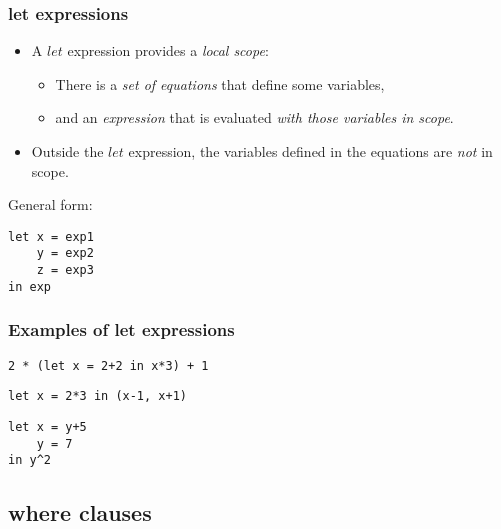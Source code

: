 \documentclass{beamer}
\begin{document}
\begin{frame}[fragile]
\frametitle{let expressions}

\begin{itemize}
\item A $let$ expression provides a \emph{local scope}:
  \begin{itemize}
  \item There is a \emph{set of equations} that define some
    variables,
  \item and an \emph{expression} that is evaluated \emph{with those
      variables in scope}.
  \end{itemize}
\item Outside the $let$ expression, the variables defined in the
  equations are \emph{not} in scope.
\end{itemize}

General form:

\begin{verbatim}
let x = exp1
    y = exp2
    z = exp3
in exp
\end{verbatim}

\end{frame}

\begin{frame}[fragile]
\frametitle{Examples of let expressions}

\begin{verbatim}
2 * (let x = 2+2 in x*3) + 1
\end{verbatim}

\begin{verbatim}
let x = 2*3 in (x-1, x+1)
\end{verbatim}

\begin{verbatim}
let x = y+5
    y = 7
in y^2
\end{verbatim}

\end{frame}

\subsection{where clauses}
\end{document}

